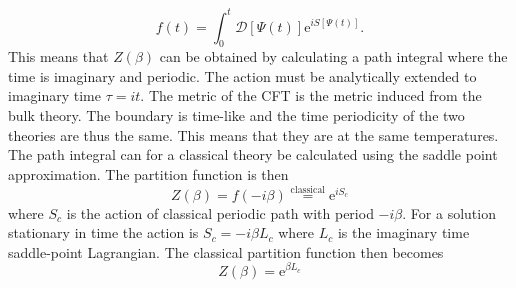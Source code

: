 \documentclass[12pt]{report}
\renewcommand{\d}{\ensuremath{\mathrm{d}}}
\newcommand{\e}{\ensuremath{\mathrm{e}}}
\renewcommand{\L}{\ensuremath{\mathcal{L}}}
\renewcommand{\i}{\ensuremath{i}}
\begin{document}
\begin{equation}
 f(t)=\int_0^t \mathcal{D}[\Psi(t)]\e^{\i S[\Psi(t)]}.
\end{equation}
This means that $Z(\beta)$ can be obtained by calculating a path integral where the time is imaginary and periodic. The action must be analytically extended to imaginary time $\tau=\i t$. 
The metric of the CFT is the metric induced from the bulk theory. The boundary is time-like and the time periodicity of the two theories are thus the same. This means that they are at the same temperatures. The path integral can for a classical theory be calculated using the saddle point approximation. The partition function is then
\begin{equation}
 Z(\beta)=f(-\i\beta)\stackrel{\mathrm{classical}}{=} \e^{ \i S_c}\label{classical}
\end{equation}
where $S_c$ is the action of classical periodic path with period $-\i\beta$. For a solution stationary in time the action is $S_c=-\i\beta L_c$ where $L_c$ is the imaginary time saddle-point Lagrangian. The classical partition function then becomes
\begin{equation}
 Z(\beta)= \e^{\beta L_c}\label{classical2}
\end{equation}
\end{document}
